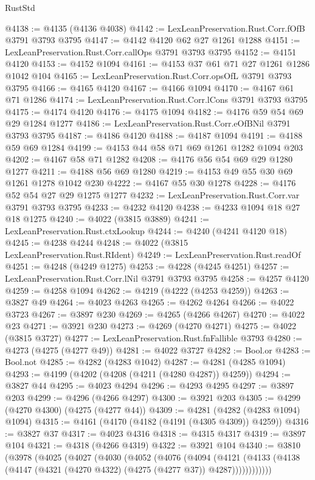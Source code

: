\begin{lexlean}{RustStd}
\begin{coremodule}
@4138 := @4135 (@4136 @4038)
@4142 := LexLeanPreservation.Rust.Corr.fOfB @3791 @3793 @3795
@4147 := @4142 @4120 @62 @27 @1261 @1288
@4151 := LexLeanPreservation.Rust.Corr.callOps @3791 @3793 @3795
@4152 := @4151 @4120
@4153 := @4152 @1094
@4161 := @4153 @37 @61 @71 @27 @1261 @1286 @1042 @104
@4165 := LexLeanPreservation.Rust.Corr.opsOfL @3791 @3793 @3795
@4166 := @4165 @4120
@4167 := @4166 @1094
@4170 := @4167 @61 @71 @1286
@4174 := LexLeanPreservation.Rust.Corr.lCons @3791 @3793 @3795
@4175 := @4174 @4120
@4176 := @4175 @1094
@4182 := @4176 @59 @54 @69 @29 @1284 @1277
@4186 := LexLeanPreservation.Rust.Corr.eOfBNil @3791 @3793 @3795
@4187 := @4186 @4120
@4188 := @4187 @1094
@4191 := @4188 @59 @69 @1284
@4199 := @4153 @44 @58 @71 @69 @1261 @1282 @1094 @203
@4202 := @4167 @58 @71 @1282
@4208 := @4176 @56 @54 @69 @29 @1280 @1277
@4211 := @4188 @56 @69 @1280
@4219 := @4153 @49 @55 @30 @69 @1261 @1278 @1042 @230
@4222 := @4167 @55 @30 @1278
@4228 := @4176 @52 @54 @27 @29 @1275 @1277
@4232 := LexLeanPreservation.Rust.Corr.var @3791 @3793 @3795
@4233 := @4232 @4120
@4238 := @4233 @1094 @18 @27 @18 @1275
@4240 := @4022 (@3815 @3889)
@4241 := LexLeanPreservation.Rust.ctxLookup
@4244 := @4240 (@4241 @4120 @18)
@4245 := @4238 @4244
@4248 := @4022 (@3815 LexLeanPreservation.Rust.RIdent)
@4249 := LexLeanPreservation.Rust.readOf
@4251 := @4248 (@4249 @1275)
@4253 := @4228 (@4245 @4251)
@4257 := LexLeanPreservation.Rust.Corr.lNil @3791 @3793 @3795
@4258 := @4257 @4120
@4259 := @4258 @1094
@4262 := @4219 (@4222 (@4253 @4259))
@4263 := @3827 @49
@4264 := @4023 @4263
@4265 := @4262 @4264
@4266 := @4022 @3723
@4267 := @3897 @230
@4269 := @4265 (@4266 @4267)
@4270 := @4022 @23
@4271 := @3921 @230
@4273 := @4269 (@4270 @4271)
@4275 := @4022 (@3815 @3727)
@4277 := LexLeanPreservation.Rust.fnFallible @3793
@4280 := @4273 (@4275 (@4277 @49))
@4281 := @4022 @3727
@4282 := Bool.or
@4283 := Bool.not
@4285 := @4282 (@4283 @1042)
@4287 := @4281 (@4285 @1094)
@4293 := @4199 (@4202 (@4208 (@4211 (@4280 @4287)) @4259))
@4294 := @3827 @44
@4295 := @4023 @4294
@4296 := @4293 @4295
@4297 := @3897 @203
@4299 := @4296 (@4266 @4297)
@4300 := @3921 @203
@4305 := @4299 (@4270 @4300) (@4275 (@4277 @44))
@4309 := @4281 (@4282 (@4283 @1094) @1094)
@4315 := @4161 (@4170 (@4182 (@4191 (@4305 @4309)) @4259))
@4316 := @3827 @37
@4317 := @4023 @4316
@4318 := @4315 @4317
@4319 := @3897 @104
@4321 := @4318 (@4266 @4319)
@4322 := @3921 @104
@4340 := @3810
    (@3978
      (@4025
        (@4027
          (@4030
            (@4052
              (@4076
                (@4094
                  (@4121
                    (@4133 (@4138 (@4147 (@4321 (@4270 @4322) (@4275 (@4277 @37)) @4287))))))))))))

\end{coremodule}
\end{lexlean}
